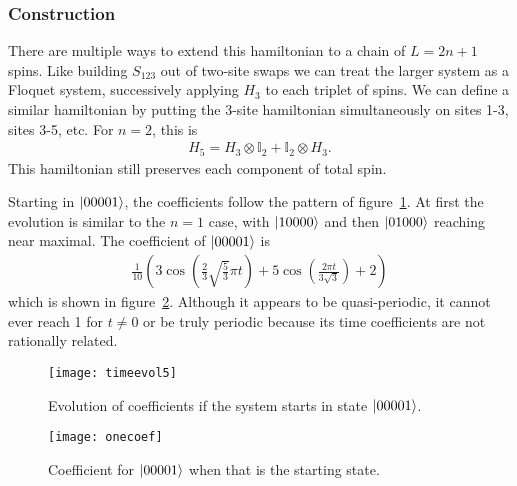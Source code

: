 \subsubsection{Construction} \label{subsub:construction} 

There are multiple ways to extend this hamiltonian to a chain of $L= 2n+1$ spins. Like building $S_{123}$ out of two-site swaps we can treat the larger system as a Floquet system, successively applying $H_3$ to each triplet of spins. We can define a similar hamiltonian by putting the 3-site hamiltonian simultaneously on sites 1-3, sites 3-5, etc. For $n=2$, this is
\begin{align}
H_5 = H_3\otimes\mathbb{I}_2 + \mathbb{I}_2\otimes H_3.
\end{align} 
This hamiltonian still preserves each component of total spin. 

Starting in $\left|00001\right\rangle$, the coefficients follow the pattern of figure~\ref{fig:timeevol5}. At first the evolution is similar to the $n=1$ case, with $\left|10000\right\rangle$ and then $\left|01000\right\rangle$ reaching near maximal. The coefficient of $\left|00001\right\rangle$ is 
\begin{align}
\frac{1}{10} \left(3 \cos \left(\frac{2}{3} \sqrt{\frac{5}{3}} \pi  t\right)+5 \cos \left(\frac{2 \pi  t}{3 \sqrt{3}}\right)+2\right)
\end{align} 
which is shown in figure~\ref{fig:onecoef}. Although it appears to be quasi-periodic, it cannot ever reach 1 for $t\ne 0$ or be truly periodic because its time coefficients are not rationally related.

\begin{figure}
	\centering
	\texttt{[image: timeevol5]}
	\caption{Evolution of coefficients if the system starts in state $\left|00001\right\rangle$.}
	\label{fig:timeevol5}
\end{figure}

\begin{figure}
	\centering
	\texttt{[image: onecoef]}
	\caption{Coefficient for $\left|00001\right\rangle$ when that is the starting state.}
	\label{fig:onecoef}
\end{figure}



